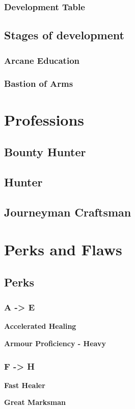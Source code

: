 \documentclass[12pt]{article}
\newcommand{\subsubsubsection}[1]{%
  \vspace{1em} %
  \noindent\textbf{\small #1}\par
  \vspace{0.5em} %
}
\begin{document}
\subsubsection{Development Table}
\subsection{Stages of development}
\subsubsection{Arcane Education}
\subsubsection{Bastion of Arms}
\section{Professions}
\subsection{Bounty Hunter}
\subsection{Hunter}
\subsection{Journeyman Craftsman}
\section{Perks and Flaws}
\subsection{Perks}
\subsubsection{A -> E}
\subsubsubsection{Accelerated Healing}
\subsubsubsection{Armour Proficiency - Heavy}
\subsubsection{F -> H}
\subsubsubsection{Fast Healer}
\subsubsubsection{Great Marksman}
\end{document}
